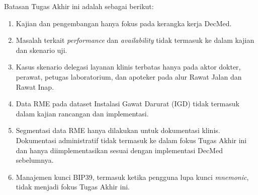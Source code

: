 Batasan Tugas Akhir ini adalah sebagai berikut:

\begin{enumerate}
	\item Kajian dan pengembangan hanya fokus pada kerangka kerja DecMed.
	\item Masalah terkait \textit{performance} dan \textit{availability} tidak termasuk ke dalam kajian dan skenario uji.
	\item Kasus skenario delegasi layanan klinis terbatas hanya pada aktor dokter, perawat, petugas laboratorium, dan apoteker pada alur Rawat Jalan dan Rawat Inap.
	\item Data RME pada dataset Instalasi Gawat Darurat (IGD) tidak termasuk dalam kajian rancangan dan implementasi.
	\item Segmentasi data RME hanya dilakukan untuk dokumentasi klinis. Dokumentasi administratif tidak termasuk ke dalam fokus Tugas Akhir ini dan hanya diimplementasikan sesuai dengan implementasi DecMed sebelumnya.
	\item Manajemen kunci BIP39, termasuk ketika pengguna lupa kunci \textit{mnemonic}, tidak menjadi fokus Tugas Akhir ini.
\end{enumerate}



